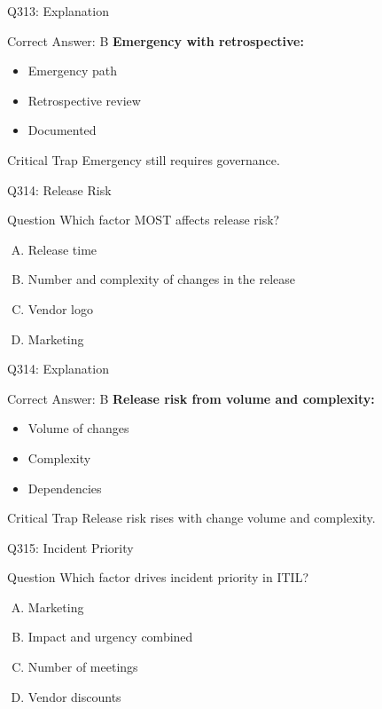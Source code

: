 \documentclass{beamer}
\begin{document}
	\begin{frame}{Q313: Explanation}
		\begin{block}{Correct Answer: B}
			\textbf{Emergency with retrospective:}
			\begin{itemize}
				\item Emergency path
				\item Retrospective review
				\item Documented
			\end{itemize}
		\end{block}
		\begin{alertblock}{Critical Trap}
			Emergency still requires governance.
		\end{alertblock}
	\end{frame}
	
	\begin{frame}{Q314: Release Risk}
		\begin{block}{Question}
			Which factor MOST affects release risk?
		\end{block}
		\begin{enumerate}[(A)]
			\item Release time
			\item Number and complexity of changes in the release
			\item Vendor logo
			\item Marketing
		\end{enumerate}
	\end{frame}
	
	\begin{frame}{Q314: Explanation}
		\begin{block}{Correct Answer: B}
			\textbf{Release risk from volume and complexity:}
			\begin{itemize}
				\item Volume of changes
				\item Complexity
				\item Dependencies
			\end{itemize}
		\end{block}
		\begin{alertblock}{Critical Trap}
			Release risk rises with change volume and complexity.
		\end{alertblock}
	\end{frame}
	
	\begin{frame}{Q315: Incident Priority}
		\begin{block}{Question}
			Which factor drives incident priority in ITIL?
		\end{block}
		\begin{enumerate}[(A)]
			\item Marketing
			\item Impact and urgency combined
			\item Number of meetings
			\item Vendor discounts
		\end{enumerate}
	\end{frame}
	
\end{document}
